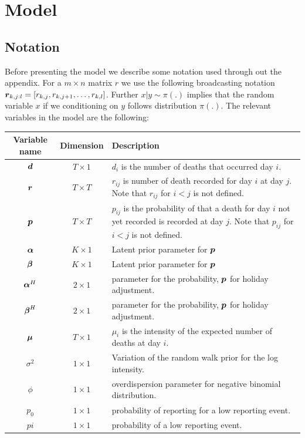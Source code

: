 \renewcommand{\thefigure}{A\arabic{figure}}
\setcounter{figure}{0}   

\section{Model}
\subsection{Notation}
Before presenting the model we describe some notation used through out the appendix. For a $m \times n$ matrix $r$ we use the following broadcasting notation ${\boldsymbol{r}}_{k,j:l}=[ r_{k,j}, r_{k,j+1}, \ldots, r_{k,l}]$.
Further $x | y \sim \pi(.)$ implies that the random variable $x$ if we conditioning on $y$ follows distribution $\pi(.)$.
The relevant variables in the model are the following:

	\begin{tabularx}{\linewidth}{ccL}
		Variable name & Dimension & Description \\  \hline
		${\boldsymbol{d}}$ & $T \times 1$ & $d_i$ is the number of deaths that occurred day $i$. \\
		${\boldsymbol{r}}$ & $T \times T$ & $r_{ij}$ is number of death recorded for day $i$ at day $j$.  Note that $r_{ij}$ for $i<j$ is not defined.   \\
		${\boldsymbol{p}}$ & $T \times T$ & $p_{ij}$ is the probability of that a death for day $i$ not yet recorded is recorded at day $j$.
		  Note that $p_{ij}$ for $i<j$ is not defined.  \\
		${\boldsymbol{\alpha}}$ & $K \times 1$ & Latent prior parameter for ${\boldsymbol{p}}$ \\
		${\boldsymbol{\beta}}$ & $K \times 1$ & Latent prior parameter for ${\boldsymbol{p}}$ \\
		${\boldsymbol{\alpha}}^H$ & $2 \times 1$ & parameter for the probability, ${\boldsymbol{p}}$ for holiday adjustment. \\
		${\boldsymbol{\beta}}^H$ & $2 \times 1$ & parameter for the probability, ${\boldsymbol{p}}$ for holiday adjustment. \\
		${\boldsymbol{\mu}}$ &  $T \times 1$ &  $\mu_i$  is the intensity of the expected number of deaths at day $i$. \\
		$\sigma^2$ & $1\times 1$ & Variation of the random walk prior for the log intensity. \\
		$\phi$ & $1\times 1$ & overdispersion parameter for negative binomial distribution. \\
		$p_0$ & $1\times 1$ & probability of reporting for a low reporting event. \\
		$pi$ & $1\times 1$ & probability of a low reporting event.
	\end{tabularx}
